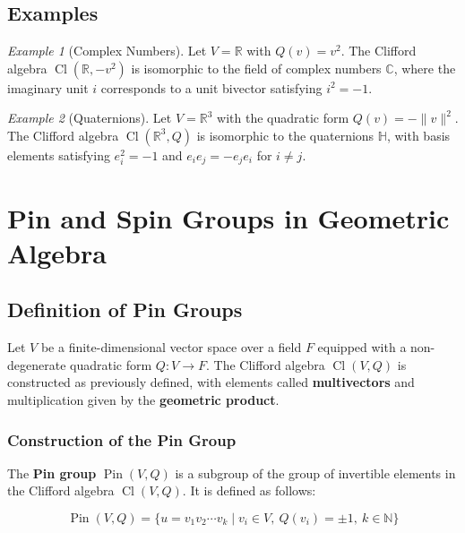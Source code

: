 \documentclass[a4paper,14pt]{article}
\theoremstyle{plain} %
\theoremstyle{definition} %
\theoremstyle{remark} %
\theoremstyle{definition}
\theoremstyle{remark}
\theoremstyle{remark}
\newtheorem{example}{Example}[section]
\begin{document}
	\subsection{Examples}
	
	\begin{example}[Complex Numbers]
		Let \( V = \mathbb{R} \) with \( Q(v) = v^2 \). The Clifford algebra \( \operatorname{Cl}(\mathbb{R}, -v^2) \) is isomorphic to the field of complex numbers \( \mathbb{C} \), where the imaginary unit \( i \) corresponds to a unit bivector satisfying \( i^2 = -1 \).
	\end{example}
	
	\begin{example}[Quaternions]
		Let \( V = \mathbb{R}^3 \) with the quadratic form \( Q(v) = - \| v \|^2 \). The Clifford algebra \( \operatorname{Cl}(\mathbb{R}^3, Q) \) is isomorphic to the quaternions \( \mathbb{H} \), with basis elements satisfying \( e_i^2 = -1 \) and \( e_i e_j = - e_j e_i \) for \( i \neq j \).
	\end{example}

	
	\section{Pin and Spin Groups in Geometric Algebra}
	
	\subsection{Definition of Pin Groups}
	
	Let \( V \) be a finite-dimensional vector space over a field \( F \) equipped with a non-degenerate quadratic form \( Q: V \rightarrow F \). The Clifford algebra \( \operatorname{Cl}(V, Q) \) is constructed as previously defined, with elements called \textbf{multivectors} and multiplication given by the \textbf{geometric product}.
	
	\subsubsection{Construction of the Pin Group}
	
	The \textbf{Pin group} \( \operatorname{Pin}(V, Q) \) is a subgroup of the group of invertible elements in the Clifford algebra \( \operatorname{Cl}(V, Q) \). It is defined as follows:
	
	\[
	\operatorname{Pin}(V, Q) = \{ u = v_1 v_2 \cdots v_k \mid v_i \in V, \ Q(v_i) = \pm 1, \ k \in \mathbb{N} \}
	\]
	
\end{document}
